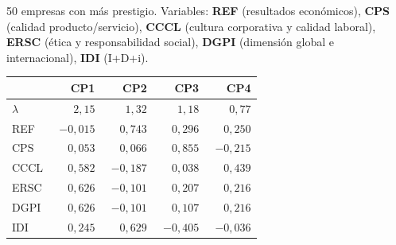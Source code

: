 \documentclass[11pt,a4paper]{article}
\begin{document}
\begin{enuncbox}
50 empresas con más prestigio. Variables: \textbf{REF} (resultados económicos), \textbf{CPS} (calidad producto/servicio), \textbf{CCCL} (cultura corporativa y calidad laboral), \textbf{ERSC} (ética y responsabilidad social), \textbf{DGPI} (dimensión global e internacional), \textbf{IDI} (I+D+i).

\begin{center}\small
\begin{tabular}{lrrrr}\toprule
 & CP1 & CP2 & CP3 & CP4\\\midrule
$\lambda$ & $2{,}15$ & $1{,}32$ & $1{,}18$ & $0{,}77$\\\midrule
REF  & $-0{,}015$ & $\phantom{-}0{,}743$ & $\phantom{-}0{,}296$ & $\phantom{-}0{,}250$\\
CPS  & $\phantom{-}0{,}053$ & $\phantom{-}0{,}066$ & $\phantom{-}0{,}855$ & $-0{,}215$\\
CCCL & $\phantom{-}0{,}582$ & $-0{,}187$ & $\phantom{-}0{,}038$ & $\phantom{-}0{,}439$\\
ERSC & $\phantom{-}0{,}626$ & $-0{,}101$ & $\phantom{-}0{,}207$ & $\phantom{-}0{,}216$\\
DGPI & $\phantom{-}0{,}626$ & $-0{,}101$ & $\phantom{-}0{,}107$ & $\phantom{-}0{,}216$\\
IDI  & $\phantom{-}0{,}245$ & $\phantom{-}0{,}629$ & $-0{,}405$ & $-0{,}036$\\\bottomrule
\end{tabular}\end{center}
\end{enuncbox}
\end{document}
